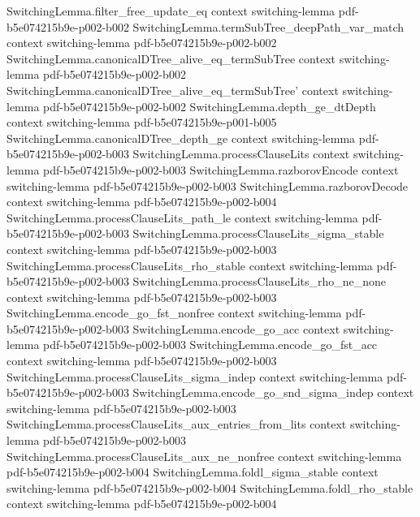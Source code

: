 \begin{lemma}
\proofstep
  {SwitchingLemma.filter_free_update_eq}
  {context}
  {switching-lemma}
  {pdf-b5e074215b9e-p002-b002}
\proofstep
  {SwitchingLemma.termSubTree_deepPath_var_match}
  {context}
  {switching-lemma}
  {pdf-b5e074215b9e-p002-b002}
\proofstep
  {SwitchingLemma.canonicalDTree_alive_eq_termSubTree}
  {context}
  {switching-lemma}
  {pdf-b5e074215b9e-p002-b002}
\proofstep
  {SwitchingLemma.canonicalDTree_alive_eq_termSubTree'}
  {context}
  {switching-lemma}
  {pdf-b5e074215b9e-p002-b002}
\proofstep
  {SwitchingLemma.depth_ge_dtDepth}
  {context}
  {switching-lemma}
  {pdf-b5e074215b9e-p001-b005}
\proofstep
  {SwitchingLemma.canonicalDTree_depth_ge}
  {context}
  {switching-lemma}
  {pdf-b5e074215b9e-p002-b003}
\proofstep
  {SwitchingLemma.processClauseLits}
  {context}
  {switching-lemma}
  {pdf-b5e074215b9e-p002-b003}
\proofstep
  {SwitchingLemma.razborovEncode}
  {context}
  {switching-lemma}
  {pdf-b5e074215b9e-p002-b003}
\proofstep
  {SwitchingLemma.razborovDecode}
  {context}
  {switching-lemma}
  {pdf-b5e074215b9e-p002-b004}
\proofstep
  {SwitchingLemma.processClauseLits_path_le}
  {context}
  {switching-lemma}
  {pdf-b5e074215b9e-p002-b003}
\proofstep
  {SwitchingLemma.processClauseLits_sigma_stable}
  {context}
  {switching-lemma}
  {pdf-b5e074215b9e-p002-b003}
\proofstep
  {SwitchingLemma.processClauseLits_rho_stable}
  {context}
  {switching-lemma}
  {pdf-b5e074215b9e-p002-b003}
\proofstep
  {SwitchingLemma.processClauseLits_rho_ne_none}
  {context}
  {switching-lemma}
  {pdf-b5e074215b9e-p002-b003}
\proofstep
  {SwitchingLemma.encode_go_fst_nonfree}
  {context}
  {switching-lemma}
  {pdf-b5e074215b9e-p002-b003}
\proofstep
  {SwitchingLemma.encode_go_acc}
  {context}
  {switching-lemma}
  {pdf-b5e074215b9e-p002-b003}
\proofstep
  {SwitchingLemma.encode_go_fst_acc}
  {context}
  {switching-lemma}
  {pdf-b5e074215b9e-p002-b003}
\proofstep
  {SwitchingLemma.processClauseLits_sigma_indep}
  {context}
  {switching-lemma}
  {pdf-b5e074215b9e-p002-b003}
\proofstep
  {SwitchingLemma.encode_go_snd_sigma_indep}
  {context}
  {switching-lemma}
  {pdf-b5e074215b9e-p002-b003}
\proofstep
  {SwitchingLemma.processClauseLits_aux_entries_from_lits}
  {context}
  {switching-lemma}
  {pdf-b5e074215b9e-p002-b003}
\proofstep
  {SwitchingLemma.processClauseLits_aux_ne_nonfree}
  {context}
  {switching-lemma}
  {pdf-b5e074215b9e-p002-b004}
\proofstep
  {SwitchingLemma.foldl_sigma_stable}
  {context}
  {switching-lemma}
  {pdf-b5e074215b9e-p002-b004}
\proofstep
  {SwitchingLemma.foldl_rho_stable}
  {context}
  {switching-lemma}
  {pdf-b5e074215b9e-p002-b004}
\proofstep

\end{lemma}

